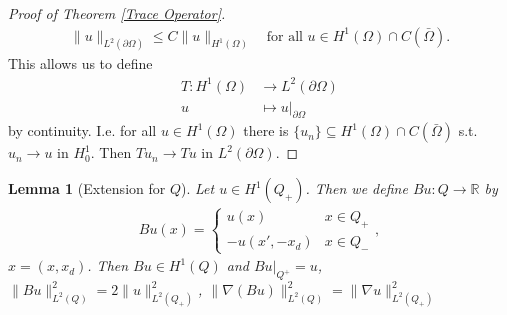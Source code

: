 \documentclass{report}
\theoremstyle{tommy}
\newtheorem{lem}[defn]{Lemma}
\begin{document}
\begin{proof}[Proof of Theorem \ref{Trace Operator}]
\begin{align*}
      \|u\|_{L^2(\partial \Omega)} \le C \|u\|_{H^1(\Omega)} \quad \text{for all } u \in H^1(\Omega) \cap C(\bar \Omega).
    \end{align*}
    This allows us to define 
    \begin{align*}
      T:  H^1(\Omega) &\longrightarrow L^2(\partial \Omega) \\
      u &\longmapsto u|_{\partial \Omega}
    \end{align*}
    by continuity. I.e. for all \(u \in H^1(\Omega)\) there is \(\{u_n\} \subseteq H^1(\Omega) \cap C(\bar \Omega)\) s.t. \(u_n \to u\) in \(H_0^1\). Then \(Tu_n \to T u\) in \(L^2(\partial \Omega)\).
  \end{proof}

  \begin{lem}[Extension for \(Q\)] Let \(u \in H^1(Q_+)\). Then we define \(Bu: Q \to \mathbb{R}\) by
    \begin{align*}
      Bu(x) = \begin{cases}
        u(x) & x \in Q_+ \\ -u(x', -x_d) & x \in Q_-
      \end{cases},
    \end{align*}
    \(x = (x, x_d)\). Then \(Bu \in H^1(Q)\) and \(Bu|_{Q^+} = u\), \(\|Bu\|^2_{L^2(Q)} = 2 \|u\|_{L^2(Q_+)}^2\), \(\|\nabla (Bu)\|_{L^2(Q)}^2 = \|\nabla u\|_{L^2(Q_+)}^2\)
  \end{lem}
\end{document}
